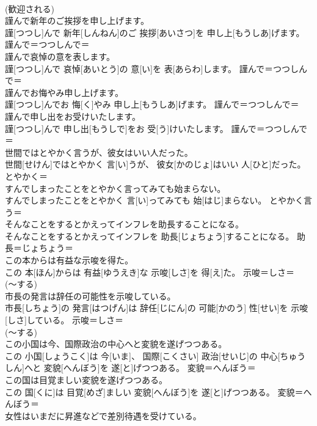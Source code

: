 \documentclass[8pt]{extreport}
\begin{document}
\begin{CJK}{UTF8}{min}
{\\	(歓迎される) 
\\	謹んで新年のご挨拶を申し上げます。	
\\	謹[つつし]んで 新年[しんねん]のご 挨拶[あいさつ]を 申し上[もうしあ]げます。	謹んで＝つつしんで＝ 
\\	謹んで哀悼の意を表します。	
\\	謹[つつし]んで 哀悼[あいとう]の 意[い]を 表[あらわ]します。	謹んで＝つつしんで＝ 
\\	謹んでお悔やみ申し上げます。	
\\	謹[つつし]んでお 悔[く]やみ 申し上[もうしあ]げます。	謹んで＝つつしんで＝ 
\\	謹んで申し出をお受けいたします。	
\\	謹[つつし]んで 申し出[もうしで]をお 受[う]けいたします。	謹んで＝つつしんで＝ 
\\	世間ではとやかく言うが、彼女はいい人だった。	
\\	世間[せけん]ではとやかく 言[い]うが、 彼女[かのじょ]はいい 人[ひと]だった。	とやかく＝ 
\\	すんでしまったことをとやかく言ってみても始まらない。	
\\	すんでしまったことをとやかく 言[い]ってみても 始[はじ]まらない。	とやかく言う＝ 
\\	そんなことをするとかえってインフレを助長することになる。	
\\	そんなことをするとかえってインフレを 助長[じょちょう]することになる。	助長＝じょちょう＝ 
\\	この本からは有益な示唆を得た。	
\\	この 本[ほん]からは 有益[ゆうえき]な 示唆[しさ]を 得[え]た。	示唆＝しさ＝ 
\\	(〜する) 
\\	市長の発言は辞任の可能性を示唆している。	
\\	市長[しちょう]の 発言[はつげん]は 辞任[じにん]の 可能[かのう] 性[せい]を 示唆[しさ]している。	示唆＝しさ＝ 
\\	(〜する) 
\\	この小国は今、国際政治の中心へと変貌を遂げつつある。	
\\	この 小国[しょうこく]は 今[いま]、 国際[こくさい] 政治[せいじ]の 中心[ちゅうしん]へと 変貌[へんぼう]を 遂[と]げつつある。	変貌＝へんぼう＝ 
\\	この国は目覚ましい変貌を遂げつつある。	
\\	この 国[くに]は 目覚[めざ]ましい 変貌[へんぼう]を 遂[と]げつつある。	変貌＝へんぼう＝ 
\\	女性はいまだに昇進などで差別待遇を受けている。	
}
\end{CJK}
\end{document}
